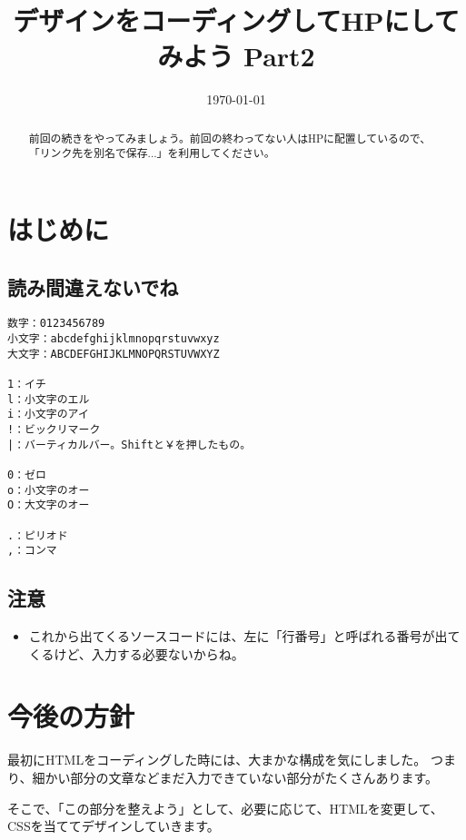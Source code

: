 \documentclass[mingoth,11pt,a4j,uplatex,dvipdfmx]{jsarticle}
\title{デザインをコーディングしてHPにしてみよう Part2}
\date{\today}
\begin{document}

\maketitle

\begin{abstract}
前回の続きをやってみましょう。前回の終わってない人はHPに配置しているので、「リンク先を別名で保存...」を利用してください。
\end{abstract}

\tableofcontents
\newpage

\section{はじめに}
\subsection{読み間違えないでね}

\begin{lstlisting}[caption=読み間違えないでね]
数字：0123456789
小文字：abcdefghijklmnopqrstuvwxyz
大文字：ABCDEFGHIJKLMNOPQRSTUVWXYZ

1：イチ
l：小文字のエル
i：小文字のアイ
!：ビックリマーク
|：バーティカルバー。Shiftと￥を押したもの。

0：ゼロ
o：小文字のオー
O：大文字のオー

.：ピリオド
,：コンマ
\end{lstlisting}

\subsection{注意}
\begin{itemize}
\item これから出てくるソースコードには、左に「行番号」と呼ばれる番号が出てくるけど、入力する必要ないからね。
\end{itemize}



\section{今後の方針}
最初にHTMLをコーディングした時には、大まかな構成を気にしました。
つまり、細かい部分の文章などまだ入力できていない部分がたくさんあります。

そこで、「この部分を整えよう」として、必要に応じて、HTMLを変更して、CSSを当ててデザインしていきます。
\end{document}
